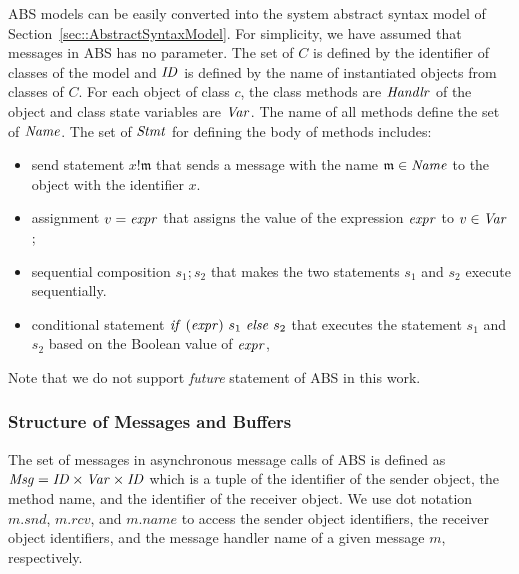 ABS models can be easily converted into the system abstract syntax model of Section~\ref{sec::AbstractSyntaxModel}. For simplicity, we have assumed that messages in ABS has no parameter. The set of $C$ is defined by the identifier of classes of the model and $\mathit{ID}$ is defined by the name of instantiated objects from classes of $C$. For each object of class $c$, the class methods are $\mathit{Handlr}$ of the object and class state variables are $\mathit{Var}$. The name of all methods define the set of $\mathit{Name}$. The set of $\mathit{Stmt}$ for defining the body of methods includes:\begin{itemize}
    \item send statement $x!\mathfrak{m}$ that sends a message with the name $\mathfrak{m}\in\mathit{Name}$ to the object with the identifier $x$.
    \item assignment $v={\it expr}$ that assigns the value of the expression ${\it expr}$ to $v\in\mathit{Var}$;
    \item sequential composition $s_1;s_2$ that makes the two statements $s_1$ and $s_2$ execute sequentially.
    \item conditional statement ${\it if}~ (\mathit{expr}) ~s_1 ~{\it else}~s_2 $ that executes the statement $s_1$ and $s_2$ based on the Boolean value of $\mathit{expr}$,
\end{itemize}
Note that we do not support \emph{future} statement of ABS in this work.

\subsubsection{Structure of Messages and Buffers}
The set of messages in asynchronous message calls of ABS is defined as $\mathit{Msg} = \mathit{ID} \times \mathit{Var} \times \mathit{ID}$ which is a tuple of the identifier of the sender object, the method name, and the identifier of the receiver object. We use dot notation $m.snd$, $m.rcv$, and $m.name$ to access the sender object identifiers, the receiver object identifiers, and the message handler name of a given message $m$, respectively. %


